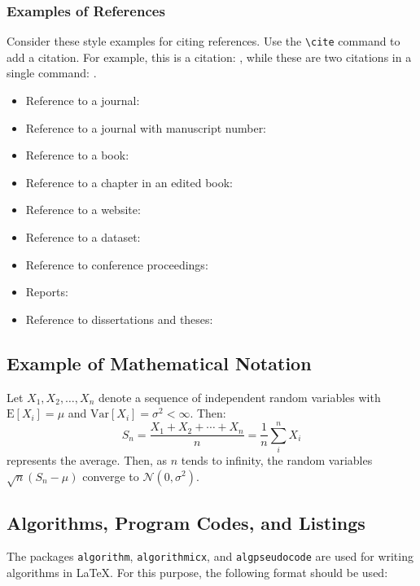 \documentclass[letterpaper]{EmergentUDB}
\begin{document}
\subsubsection{Examples of References}
Consider these style examples for citing references. Use the \verb|\cite| command to add a citation. For example, this is a citation: \cite{Jackson}, while these are two citations in a single command: \cite{Grady,Piumsomboon:2017}.
\begin{itemize}
\item Reference to a journal: \cite{Grady}
\item Reference to a journal with manuscript number: \cite{Jerrentrup}
\item Reference to a book: \cite{Jackson}
\item Reference to a chapter in an edited book: \cite{Aron, Cardona2020}
\item Reference to a website: \cite{testWeb}
\item Reference to a dataset: \cite{testDataset}
\item Reference to conference proceedings: \cite{Piumsomboon:2017}
\item Reports: \cite{testReport}
\item Reference to dissertations and theses: \cite{testThesis}
\end{itemize}


\subsection{Example of Mathematical Notation}

Let $X_1, X_2, \ldots, X_n$ denote a sequence of independent random variables with $\text{E}[X_i] = \mu$ and $\text{Var}[X_i] = \sigma^2 < \infty$. Then:
%
\begin{equation}
S_n = \frac{X_1 + X_2 + \cdots + X_n}{n}
      = \frac{1}{n}\sum_{i}^{n} X_i
\end{equation}
%
represents the average. Then, as $n$ tends to infinity, the random variables $\sqrt{n}(S_n - \mu)$ converge to $\mathcal{N}(0, \sigma^2)$.

\subsection{Algorithms, Program Codes, and Listings}\label{sec7}

The packages \verb+algorithm+, \verb+algorithmicx+, and \verb+algpseudocode+ are used for writing algorithms in \LaTeX.
For this purpose, the following format should be used:
\end{document}

